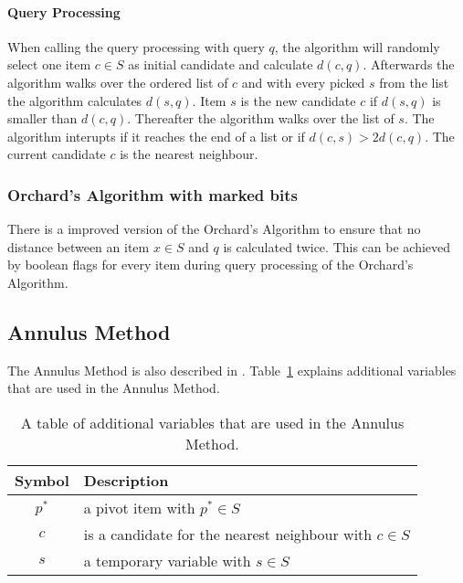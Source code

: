 \documentclass[runningheads,a4paper]{llncs}
\begin{document}
\paragraph{Query Processing}

When calling the query processing with query $q$, the algorithm will randomly select one item $c \in S$ as initial
candidate and calculate $d(c, q)$. Afterwards the algorithm walks over the ordered list of $c$ and with every picked $s$
from the list the algorithm calculates $d(s, q)$. Item $s$ is the new candidate $c$ if $d(s, q)$ is smaller than
$d(c, q)$. Thereafter the algorithm walks over the list of $s$. The algorithm interupts if it reaches the end of a list
or if $d(c, s) > 2d(c, q)$. The current candidate $c$ is the nearest neighbour.

\subsubsection{Orchard’s Algorithm with marked bits}

There is a improved version of the Orchard’s Algorithm to ensure that no distance between an item $x \in S$ and $q$
is calculated twice. This can be achieved by boolean flags for every item during query processing of the Orchard’s
Algorithm.

\subsection{Annulus Method}

The Annulus Method is also described in \cite{Clarkson}. Table~\ref{tab:notation:annulus} explains additional variables
that are used in the Annulus Method.

\begin{table}[H]
	\begin{center}
		\begin{tabularx}{\textwidth}{c X}
			\textbf{Symbol} & \textbf{Description}\\
			\hline
			$p^*$ & a pivot item with $p^* \in S$\\
			$c$ & is a candidate for the nearest neighbour with $c \in S$\\
			$s$ & a temporary variable with $s \in S$\\
		\end{tabularx}
	\end{center}
	\caption{A table of additional variables that are used in the Annulus Method.}
	\label{tab:notation:annulus}
\end{table}
\end{document}
